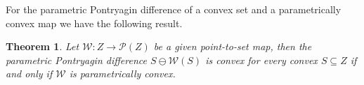 \documentclass[journal]{IEEEtran}
\newcounter{thmcount}
\newtheorem{thm}[thmcount]{Theorem}
\theoremstyle{remark}
\theoremstyle{definition}
\begin{document}
%
For the parametric Pontryagin difference of a convex set and a parametrically convex map we 
have the following result.
%
\begin{thm}\label{thm:convexity:of:pontryagin:difference}
Let $\mathcal W: Z\rightarrow\mathscr P(Z)$ be a given point-to-set map, then the parametric Pontryagin difference $S \ominus \mathcal W(S)$ is convex for every convex $S\subseteq Z$ if and only if $\mathcal W$ is parametrically convex.
\end{thm}
%
\end{document}
